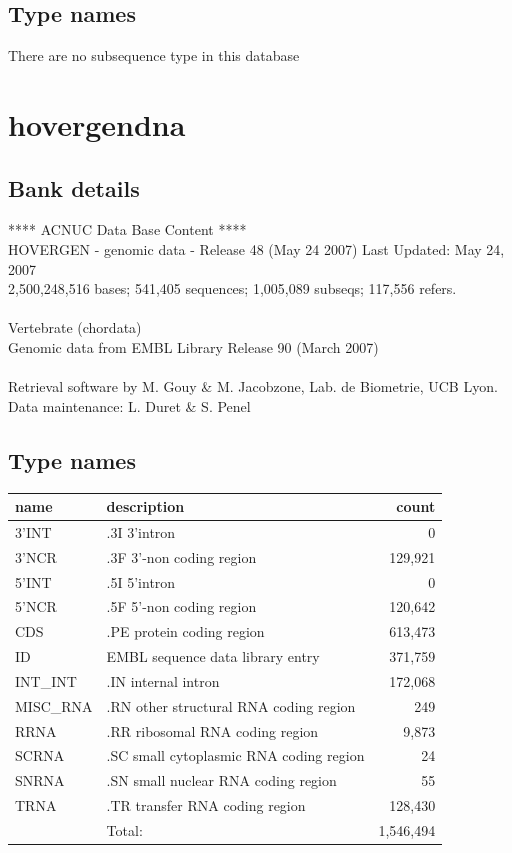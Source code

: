 \documentclass{article}
\begin{document}
\begin{Schunk}
\subsection{Type names}
There are no subsequence type in this database
\section{ hovergendna }
\subsection{Bank details}
               ****     ACNUC Data Base Content      ****                      \\
 HOVERGEN - genomic data - Release 48 (May 24 2007) Last Updated: May 24, 2007\\
2,500,248,516 bases; 541,405 sequences; 1,005,089 subseqs; 117,556 refers.\\
                                                                               \\
                       Vertebrate (chordata)\\
    Genomic data from EMBL Library Release 90 (March 2007)\\
\\
Retrieval software by M. Gouy \& M. Jacobzone, Lab. de Biometrie, UCB Lyon.\\
Data maintenance: L. Duret \& S. Penel\\


\subsection{Type names}
\noindent\begin{tabular}{llr}
\hline \hline
name & description & count \\
\hline
3'INT  &  .3I 3'intron  &  0 \\
3'NCR  &  .3F  3'-non coding region  &  129,921 \\
5'INT  &  .5I 5'intron  &  0 \\
5'NCR  &  .5F  5'-non coding region  &  120,642 \\
CDS  &  .PE protein coding region  &  613,473 \\
ID  &  EMBL sequence data library entry  &  371,759 \\
INT\_INT  &  .IN  internal intron  &  172,068 \\
MISC\_RNA  &  .RN other structural RNA coding region  &  249 \\
RRNA  &  .RR ribosomal RNA coding region  &  9,873 \\
SCRNA  &  .SC small cytoplasmic RNA coding region  &  24 \\
SNRNA  &  .SN small nuclear RNA coding region  &  55 \\
TRNA  &  .TR transfer RNA coding region  &  128,430 \\
\hline
 & Total: & 1,546,494 \\
\hline \hline
\end{tabular}


\end{Schunk}
\end{document}
